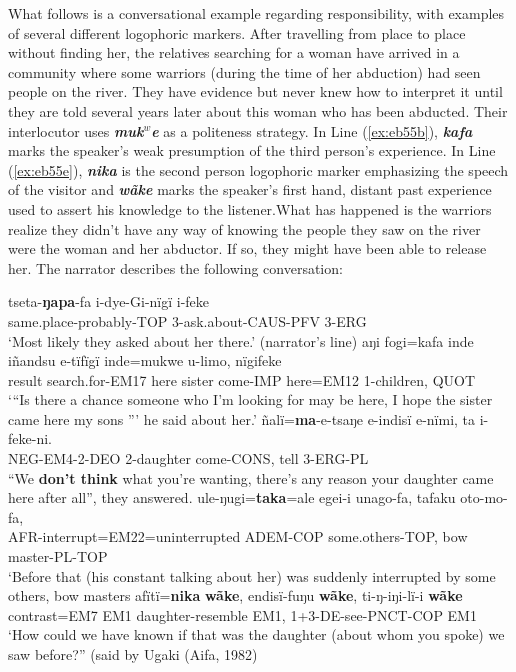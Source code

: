 \documentclass[output=paper]{langsci/langscibook}
\begin{document}
What follows is a conversational example regarding responsibility,  with examples of several different logophoric markers.  After travelling from place to place without finding her, the relatives searching for a woman have arrived in a community where some warriors (during the time of her abduction) had seen people on the river.  They have evidence but never knew how to interpret it until they are told several years later about this woman who has been abducted.  Their interlocutor uses \textbf{\textit{muk$^w$e}} as a politeness strategy.  In Line (\ref{ex:eb55b}), \textbf{\textit{kafa}} marks the speaker’s weak presumption of the third person’s experience.  In Line (\ref{ex:eb55e}), \textbf{\textit{nika}} is the second person logophoric marker emphasizing the speech of the visitor and \textbf{\textit{wãke}}  marks the speaker’s first hand, distant past experience used to assert his knowledge to the listener.What has happened is the warriors realize they didn’t have any way of knowing the people they saw on the river were the woman and her abductor.  If so,  they might have been able to release her. The narrator describes the following conversation: 

\begin{exe}
\ex \label{ex:eb55}
	\begin{xlist}
	\ex \label{ex:eb55a}
	\gll tseta-\textbf{ŋapa}-fa i-dye-Gi-nïgï i-feke\\
	same.place-probably-TOP 3-ask.about-CAUS-PFV 3-ERG\\
	\trans ‘Most likely they asked about her there.’ (narrator’s line)
	\ex \label{ex:eb55b}
	\gll aŋi fogi=kafa inde iñandsu e-tïfïgï inde=mukwe u-limo, nïgifeke\\
	result search.for-EM17 here  sister come-IMP here=EM12 1-children, QUOT\\
	\trans ‘“Is there a chance someone who I’m looking for may be here, I hope the sister came here my sons ”’ he said about her.’
	\ex \label{ex:eb55c}
	\gll ñalï=\textbf{ma}-e-tsaŋe e-indisï e-nïmi, ta i-feke-ni.\\
	NEG-EM4-2-DEO 2-daughter come-CONS, tell 3-ERG-PL\\ 
	\trans “We \textbf{don’t think} what you’re wanting, there’s any reason your daughter came here after all”, they answered.
	\ex \label{ex:eb55d}
	\gll ule-ŋugi=\textbf{taka}=ale egei-i unago-fa, tafaku oto-mo-fa,\\
	AFR-interrupt=EM22=uninterrupted ADEM-COP some.others-TOP, bow master-PL-TOP\\
	\trans ‘Before that (his constant talking about her) was suddenly interrupted by some others, bow masters
	\ex \label{ex:eb55e}
	\gll afïtï=\textbf{nika} \textbf{wãke}, endisï-fuŋu \textbf{wãke}, ti-ŋ-iŋi-lï-i \textbf{wãke}\\
	contrast=EM7 EM1 daughter-resemble EM1, 1+3-DE-see-PNCT-COP EM1\\
	\trans ‘How could we have known if that was the daughter (about whom you spoke) we saw before?” (said by Ugaki (Aifa, 1982)
\end{xlist}
\end{exe}
\end{document}
